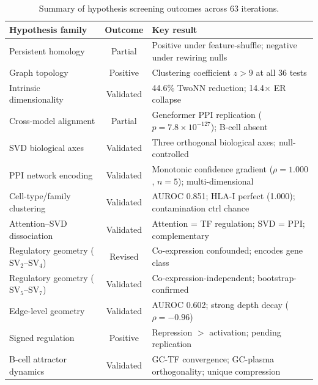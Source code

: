 \documentclass[10pt,twocolumn]{article}
\newcommand{\SV}[1]{\mathrm{SV}_{#1}}
\begin{document}
\begin{table}[H]
\centering
\caption{Summary of hypothesis screening outcomes across 63 iterations.}
\label{tab:hypothesis_summary}
\small
\begin{tabular}{p{4.5cm}cp{6.5cm}}
\toprule
Hypothesis family & Outcome & Key result \\
\midrule
Persistent homology & Partial & Positive under feature-shuffle; negative under rewiring nulls \\
Graph topology & Positive & Clustering coefficient $z > 9$ at all 36 tests \\
Intrinsic dimensionality & Validated & 44.6\% TwoNN reduction; 14.4$\times$ ER collapse \\
Cross-model alignment & Partial & Geneformer PPI replication ($p = 7.8 \times 10^{-127}$); B-cell absent \\
SVD biological axes & Validated & Three orthogonal biological axes; null-controlled \\
PPI network encoding & Validated & Monotonic confidence gradient ($\rho = 1.000$, $n = 5$); multi-dimensional \\
Cell-type/family clustering & Validated & AUROC 0.851; HLA-I perfect (1.000); contamination ctrl chance \\
Attention--SVD dissociation & Validated & Attention = TF regulation; SVD = PPI; complementary \\
Regulatory geometry ($\SV{2}$--$\SV{4}$) & Revised & Co-expression confounded; encodes gene class \\
Regulatory geometry ($\SV{5}$--$\SV{7}$) & Validated & Co-expression-independent; bootstrap-confirmed \\
Edge-level geometry & Validated & AUROC 0.602; strong depth decay ($\rho = -0.96$) \\
Signed regulation & Positive & Repression $>$ activation; pending replication \\
B-cell attractor dynamics & Validated & GC-TF convergence; GC-plasma orthogonality; unique compression \\
\bottomrule
\end{tabular}
\end{table}
\end{document}
